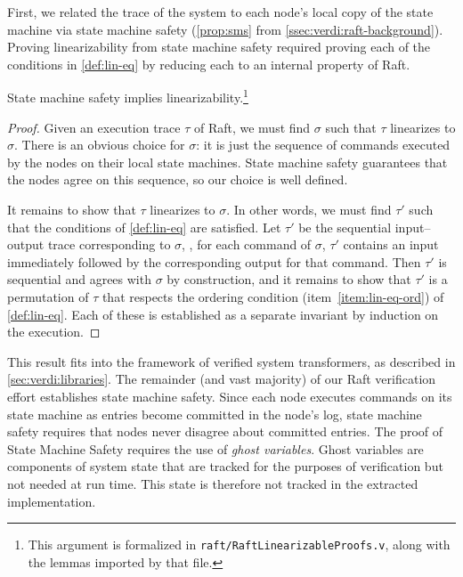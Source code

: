 First, we related the trace of the system
  to each node's local copy of the state machine
  via state machine safety (\cref{prop:sms} from \cref{ssec:verdi:raft-background}).
Proving linearizability from state machine safety required
  proving each of the conditions in \cref{def:lin-eq}
  by reducing each to an internal property of Raft.
\begin{theorem}
  State machine safety implies linearizability.\footnote{This argument is formalized in \texttt{raft/RaftLinearizableProofs.v}, along with the lemmas imported by that file.}
\end{theorem}
\begin{proof}
  Given an execution trace $\tau$ of Raft,
    we must find $\sigma$ such that $\tau$ linearizes to $\sigma$.
  There is an obvious choice for $\sigma$:
    it is just the sequence of commands executed by the nodes
    on their local state machines.
  State machine safety guarantees that the nodes agree on this sequence,
    so our choice is well defined.

  It remains to show that $\tau$ linearizes to $\sigma$.
  In other words, we must find $\tau'$ such that
    the conditions of \cref{def:lin-eq} are satisfied.
  Let $\tau'$ be the sequential input--output trace corresponding to $\sigma$,
    \ie, for each command of $\sigma$,
    $\tau'$ contains an input immediately followed by the corresponding output
    for that command.
  Then $\tau'$ is sequential and agrees with $\sigma$ by construction,
    and it remains to show that $\tau'$ is
    a permutation of $\tau$ that respects the ordering condition
    (item~\ref{item:lin-eq-ord}) of \cref{def:lin-eq}.
  Each of these is established as a separate invariant by induction on the execution.
\end{proof}

This result fits into the framework of verified system transformers,
  as described in \cref{sec:verdi:libraries}.
The remainder (and vast majority) of our Raft verification effort
  establishes state machine safety.
Since each node executes commands on its
  state machine as entries become committed in the node's log,
  state machine safety requires that nodes never disagree
  about committed entries.
The proof of State Machine Safety requires
  the use of \textit{ghost variables}.
Ghost variables are components of system state
  that are tracked for the purposes of verification
  but not needed at run time.
This state is therefore not tracked in the extracted implementation.


